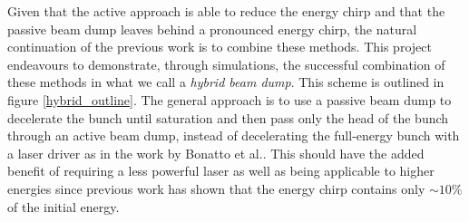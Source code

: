 \indent Given that the active approach is able to reduce the energy chirp and that the passive beam dump leaves behind a pronounced energy chirp, the natural continuation of the previous work is to combine these methods. This project endeavours to demonstrate, through simulations, the successful combination of these methods in what we call a \textit{hybrid beam dump}. This scheme is outlined in figure \ref{hybrid_outline}.  The general approach is to use a passive beam dump to decelerate the bunch until saturation and then pass only the head of the bunch through an active beam dump, instead of decelerating the full-energy bunch with a laser driver as in the work by Bonatto et al.. This should have the added benefit of requiring a less powerful laser as well as being applicable to higher energies since previous work has shown that the energy chirp contains only $\sim 10\%$ of the initial energy. 











